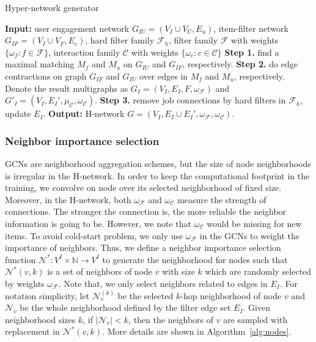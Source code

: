 \documentclass[manuscript,screen,review]{acmart}
\newcommand\Fcal{\mathcal{F}}
\newcommand\Ucal{\mathcal{U}}
\newcommand{\ubf}{\bm{u}}
\newcommand{\Ccal}{\mathcal{C}}
\newcommand{\Ncal}{\mathcal{N}}
\begin{document}
\vspace{-1em}
\begin{algorithm}[h]
\caption{Hyper-network generator}
\begin{algorithmic}[1]\label{al:hnet}
\STATE \textbf{Input:} user engagement network $G_{IU}=(V_I\cup V_U,E_u)$,
item-filter network $G_{IF}=(V_I\cup V_F,E_c)$, 
hard filter family $\mathcal{F}_h$,
filter family $\mathcal{F}$ with weights $\{\omega_f:f\in\mathcal{F}\}$,
interaction family $\mathcal{C}$ with weights $\{\omega_c:c\in\mathcal{C}\}$
\STATE \textbf{Step 1.} find a maximal matching $M_f$ and $M_u$ on $G_{IU}$ and $G_{IF}$, respectively.
\STATE \textbf{Step 2.} do edge contractions on graph $G_{IF}$ and $G_{IU}$ over edges in $M_f$ and $M_u$, respectively. Denote the result multigraphs as $G_I=(V_I,E_I,F,\omega_{\mathcal{F}})$ and $G'_I=(V_I,E_I',\mu_{\mathcal{C}},\omega_{\mathcal{C}})$.
\STATE \textbf{Step 3.} remove job connections by hard filters in $\mathcal{F}_h$, update $E_I$.
\STATE 
\textbf{Output:} H-network $G=(V_I,E_I\cup E_I',\omega_{\mathcal{F}},\omega_{\mathcal{C}})$.
\end{algorithmic}
\end{algorithm}
\vspace{-2em}

\subsubsection{Neighbor importance selection} 
GCNs are neighborhood aggregation schemes, but the size of node neighborhoods is irregular in the H-network. In order to keep the computational footprint in the training, we convolve on node over its selected  neighborhood of fixed size. Moreover, in the H-network, both $\omega_{\Fcal}$ and $\omega_{\Ccal}$ measure the strength of connections. The stronger the connection is, the more reliable the neighbor information is going to be.
However, we note that $\omega_{\Ccal}$ would be missing for new items.
To avoid cold-start problem, we only use $\omega_{\Fcal}$ in the GCNs to weight the importance of neighbors.
Thus, we define a neighbor importance selection function $\Ncal^*: V^I\times\mathbb{N}\to V^I$ to generate the neighborhood for nodes such that $\Ncal^*(v,k)$ is a set of neighbors of node $v$ with size $k$ which are randomly selected by weights $\omega_{\Fcal}$.
Note that, we only select neighbors related to edges in $E_I$.  For notation simplicity, let $\Ncal^{(k)}_v$ be the selected $k$-hop neighborhood of node $v$ and $\Ncal_v$ be the whole neighborhood defined by the filter edge set $E_I$. Given neighborhood sizes $k$,  if $|\Ncal_v|< k$, then the neighbors of $v$ are sampled with replacement in $\Ncal^*(v,k)$. 
More details are shown in Algorithm~\ref{alg:nodes}. 
\end{document}
